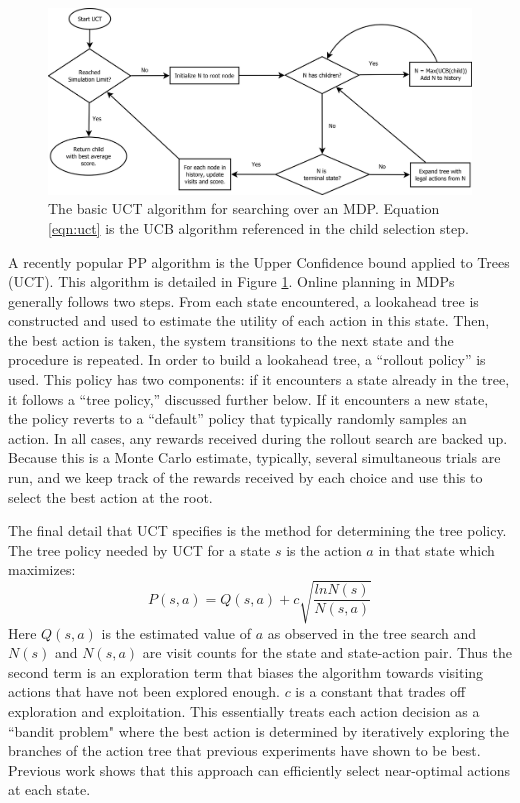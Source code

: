 \begin{figure}
\centering
\includegraphics[width=\linewidth]{uct.png}
\caption{The basic UCT algorithm for searching over an MDP. Equation \ref{eqn:uct} is
the UCB algorithm referenced in the child selection step.}
\label{uct-diagram}
\end{figure}

A recently popular PP algorithm is the Upper Confidence bound applied to Trees (UCT)\cite{kocsis_bandit_2006}.
This algorithm is detailed in Figure \ref{uct-diagram}.
Online planning in MDPs generally follows two steps. From each state
encountered, a lookahead tree is constructed and used to estimate the
utility of each action in this state. Then, the best action is taken,
the system transitions to the next state and the procedure is
repeated. In order to build a lookahead tree, a ``rollout policy'' is
used. This policy has two components: if it encounters a state already
in the tree, it follows a ``tree policy,'' discussed further below. If
it encounters a new state, the policy reverts to a ``default'' policy
that typically randomly samples an action. In all cases, any rewards
received during the rollout search are backed up. Because this is a
Monte Carlo estimate, typically, several simultaneous trials are run,
and we keep track of the rewards received by each choice and
use this to select the best action at the root.

The final detail that UCT specifies is the method for determining the tree policy.
The tree policy needed by UCT for a state $s$ is the action $a$ in that state which maximizes:
\begin{equation}
P(s,a) = Q(s,a) + c\sqrt{\frac{ln N(s)}{N(s,a)}}\label{eqn:uct}
\end{equation}
Here $Q(s,a)$ is the estimated value of $a$ as observed in the tree
search and $N(s)$ and $N(s,a)$ are visit counts for the state and
state-action pair. Thus the second term is an exploration term that
biases the algorithm towards visiting actions that have not been
explored enough. $c$ is a constant that trades off exploration and
exploitation. This essentially treats each action decision
as a ``bandit problem" where the best action is determined by iteratively
exploring the branches of the action tree that previous experiments
have shown to be best.  Previous work \cite{uct-go} shows that this approach can
efficiently select near-optimal actions at each state.


